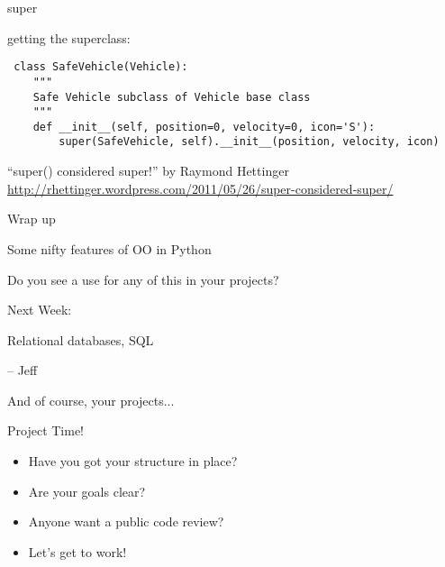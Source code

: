 \documentclass{beamer}
\begin{document}
\begin{frame}[fragile]{super}

{\Large getting the superclass:}
\begin{verbatim}
￼class SafeVehicle(Vehicle):
    """
    Safe Vehicle subclass of Vehicle base class
    """
    def __init__(self, position=0, velocity=0, icon='S'):
        super(SafeVehicle, self).__init__(position, velocity, icon)
\end{verbatim}

\vfill
{\Large ``super() considered super!'' by Raymond Hettinger }
\vfill
\url{http://rhettinger.wordpress.com/2011/05/26/super-considered-super/}
\end{frame} 









\begin{frame}[fragile]{Wrap up}

\vfill
{\Large Some nifty features of OO in Python}

\vfill
{\Large Do you see a use for any of this in your projects?}

\vfill

\end{frame}

\begin{frame}[fragile]{Next Week:}

\vfill
{\LARGE Relational databases, SQL}

\vfill
{\Large  -- Jeff}

\vfill
{\Large And of course, your projects...}

\vfill

\end{frame}

\begin{frame}[fragile]{Project Time!}

\begin{itemize}
    \item Have you got your structure in place? 
    \item Are your goals clear?
    \item Anyone want a public code review?
    \item Let's get to work!
\end{itemize}

\end{frame}
\end{document}
